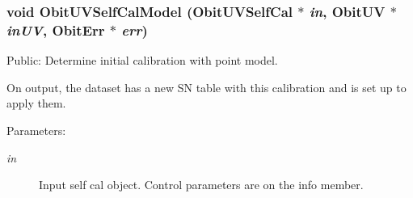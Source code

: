 \subsubsection{\setlength{\rightskip}{0pt plus 5cm}void Obit\-UVSelf\-Cal\-Model ({\bf Obit\-UVSelf\-Cal} $\ast$ {\em in}, {\bf Obit\-UV} $\ast$ {\em in\-UV}, {\bf Obit\-Err} $\ast$ {\em err})}\label{ObitUVSelfCal_8c_a12}


Public: Determine initial calibration with point model. 

On output, the dataset has a new SN table with this calibration and is set up to apply them. \begin{Desc}
\item[Parameters:]
\begin{description}
\item[{\em in}]Input self cal object. Control parameters are on the info member. \begin{itemize}

\end{itemize}
\end{description}
\end{Desc}
